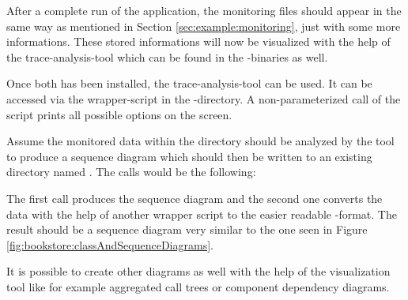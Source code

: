 \setBashListing



After a complete run of the application, the monitoring files should appear in the same way as mentioned in Section \ref{sec:example:monitoring}, just with some more informations. These stored informations will now be visualized with the help of the trace-analysis-tool which can be found in the \Kieker{}-binaries as well.\\

 \vspace{3mm}

Once both has been installed, the trace-analysis-tool can be used. It can be accessed via the wrapper-script  in the -directory. A non-parameterized call of the script prints all possible options on the screen.

Assume the monitored data within the directory  should be analyzed by the tool to produce a sequence diagram which should then be written to an existing directory named . The calls would be the following:
\setBashListing

The first call produces the sequence diagram and the second one converts the data with the help of another wrapper script to the easier readable -format. The result should be a sequence diagram very similar to the one seen in Figure \ref{fig:bookstore:classAndSequenceDiagrams}.

It is possible to create other diagrams as well with the help of the visualization tool like for example aggregated call trees or component dependency diagrams. 

